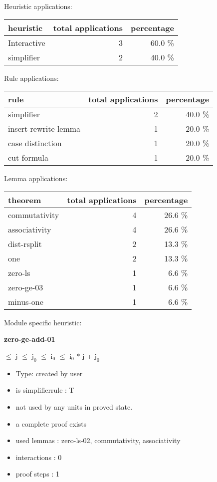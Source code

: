 \documentclass[a4paper]{article}
\begin{document}
\medskip


Heuristic applications:

\begin{supertabular}{l|r|r}
heuristic	& total applications & percentage \\ \hline
Interactive & 3 & 60.0 \% \\
simplifier & 2 & 40.0 \% \\

\end{supertabular}

Rule applications:

\begin{supertabular}{l|r|r}
rule	        & total applications & percentage \\ \hline
simplifier & 2 & 40.0 \% \\
insert rewrite lemma & 1 & 20.0 \% \\
case distinction & 1 & 20.0 \% \\
cut formula & 1 & 20.0 \% \\

\end{supertabular}

Lemma applications:

\begin{supertabular}{l|r|r}
theorem	        & total applications & percentage \\ \hline
commutativity & 4 & 26.6 \% \\
associativity & 4 & 26.6 \% \\
dist-rsplit & 2 & 13.3 \% \\
one & 2 & 13.3 \% \\
zero-ls & 1 & 6.6 \% \\
zero-ge-03 & 1 & 6.6 \% \\
minus-one & 1 & 6.6 \% \\

\end{supertabular}

Module specific heuristic:

\pagebreak

{\LARGE\bf zero-ge-add-01}\label{lemma-zero-ge-add-01}

\medskip

  $\le$ j  $\le$ $\mbox{j}_{0}$  $\le$ $\mbox{i}_{0}$  $\le$ $\mbox{i}_{0}$ $*$ j + $\mbox{j}_{0}$

\begin{itemize}

\item Type: created by user

\item is simplifierrule : T
\item not used by any units in proved state.
\item       a complete proof exists
\item       used lemmas  : zero-ls-02, commutativity, associativity
\item       interactions : 0
\item       proof steps  : 1
\end{itemize}
\end{document}
